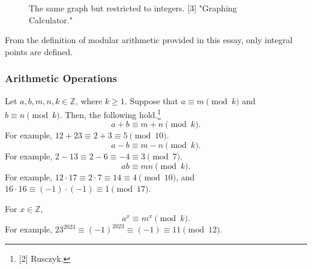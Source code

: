 \documentclass{article}
\newcommand{\Z}{\mathbb{Z}}
\begin{document}
\begin{figure}[H]
    \centering
    \caption{The same graph but restricted to integers. [3] "Graphing Calculator."}
\end{figure}
From the definition of modular arithmetic provided in this essay, only integral points are defined.
\subsubsection{Arithmetic Operations}
Let $a,b,m,n,k \in \Z$, where $k \ge 1$. Suppose that $a \equiv m \pmod k$ and $b \equiv n \pmod k$. Then, the following hold.\footnote{[2] Rusczyk.}
$$a+b \equiv m+n \pmod k.$$ For example, $12 + 23 \equiv 2 + 3 \equiv 5 \pmod {10}$.
$$a-b \equiv m-n \pmod k.$$ For example, $2-13 \equiv 2- 6 \equiv -4 \equiv 3 \pmod 7$.
$$ab \equiv mn \pmod k.$$ For example, $12 \cdot 17 \equiv 2 \cdot 7 \equiv 14 \equiv 4 \pmod{10}$, and  $16 \cdot 16 \equiv (-1) \cdot (-1) \equiv 1 \pmod {17}$.

For $x \in \Z,$ \[a^x \equiv m^x \pmod k.\] For example, $23^{2023} \equiv (-1)^{2023} \equiv (-1) \equiv 11 \pmod{12}$.
\end{document}
